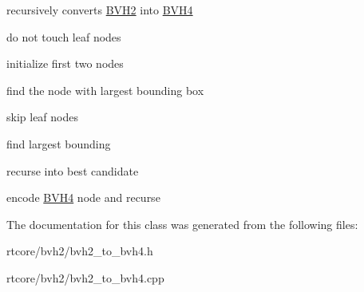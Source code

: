 recursively converts \hyperlink{classembree_1_1_b_v_h2}{BVH2} into \hyperlink{classembree_1_1_b_v_h4}{BVH4} 



do not touch leaf nodes

initialize first two nodes

find the node with largest bounding box

skip leaf nodes

find largest bounding

recurse into best candidate

encode \hyperlink{classembree_1_1_b_v_h4}{BVH4} node and recurse 



The documentation for this class was generated from the following files:\begin{DoxyCompactItemize}
\item 
rtcore/bvh2/bvh2\_\-to\_\-bvh4.h\item 
rtcore/bvh2/bvh2\_\-to\_\-bvh4.cpp\end{DoxyCompactItemize}
